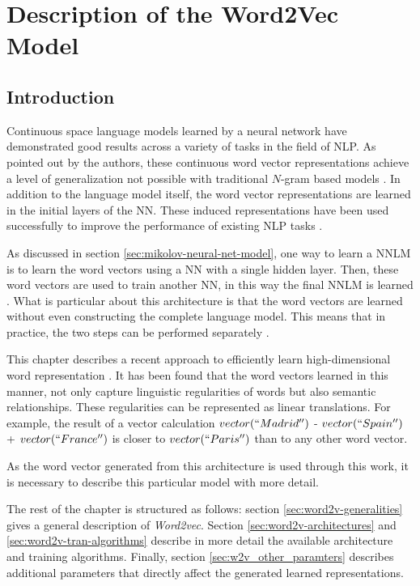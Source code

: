\chapter{Description of the Word2Vec Model }
\label{chap:word2vec_description}


\section{Introduction}
Continuous space language  models
learned by a neural network have
demonstrated good results across a variety of tasks in the field of \ac{NLP}.  As pointed out by
the authors, these continuous word vector representations achieve a level of
generalization not possible with  traditional $N$-gram based models
\cite{conf/icassp/MikolovKBGC09}. In addition to the language model itself,
the word vector representations are learned in the initial layers of the
\ac{NN}. These 
induced representations  have been used successfully to improve the
performance of existing \ac{NLP} tasks \cite{collobert:2008}
\cite{Turian:2010:WRS:1858681.1858721}. 

As discussed in section \ref{sec:mikolov-neural-net-model},  one  way to learn a
\ac{NNLM} is to learn the word vectors using  a \ac{NN} with a single hidden
layer. Then, these word vectors are used to  train another \ac{NN}, in this 
way   the final \ac{NNLM} is learned \cite{conf/icassp/MikolovKBGC09}.   
What is particular about this architecture is that the  word  vectors are learned
 without  even constructing the complete language model.  This means
that in practice,  the two steps can be performed separately \cite{conf/icassp/MikolovKBGC09}. 

This chapter describes  a recent approach to efficiently learn
high-dimensional word representation \cite{DBLP:journals/corr/abs-1301-3781}.  It has been found that the word vectors learned in this manner, 
not only capture linguistic regularities of words  but also semantic
relationships. These regularities can be represented as linear translations.
For example, the result of a vector calculation $vector(``Madrid'')$ -
$vector(``Spain'')$ + $vector(``France'')$ is closer to $vector(``Paris'')$ than to any
other word vector. \cite{DBLP:journals/corr/abs-1301-3781,MikolovSCCD13,conf/naacl/MikolovYZ13}

As the word vector generated from this architecture is used 
through this work, it is necessary to describe this particular model with more
detail.

The rest of the chapter is structured as follows: section
\ref{sec:word2v-generalities} gives a general description of
\textit{Word2vec}.  Section \ref{sec:word2v-architectures} and
\ref{sec:word2v-tran-algorithms} describe in more detail the available
architecture and training algorithms. Finally, section
\ref{sec:w2v_other_paramters} describes additional  parameters that
directly affect the generated learned representations.

